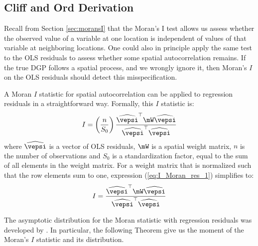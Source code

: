 \documentclass[english,12pt]{book}\usepackage[]{graphicx}\usepackage[]{xcolor}
\begin{document}
\subsection{Cliff and Ord Derivation}

Recall from Section \ref{sec:moransI} that the Moran's I test allows us assess whether the observed value of a variable at one location is independent of values of that variable at neighboring locations. One could also in principle apply the same test to the OLS residuals to assess whether some spatial autocorrelation remains. If the true DGP follows a spatial process, and we wrongly ignore it, then Moran's $I$ on the OLS residuals should detect this misspecification.

A Moran $I$ statistic for spatial autocorrelation can be applied to regression residuals in a straightforward way. Formally, this $I$ statistic is:
\begin{equation*}
I = \left(\frac{n}{S_0}\right)\frac{\widehat{\vepsi}^\top \mW\widehat{\vepsi}}{\widehat{\vepsi}^\top\widehat{\vepsi}}
\end{equation*}
%
where $\widehat{\vepsi}$ is a vector of OLS residuals, $\mW$ is a spatial weight matrix, $n$ is the number of observations and $S_0$ is a standardization factor, equal to the sum of all elements in the weight matrix. For a weight matrix that is normalized such that the row elements sum to one, expression (\ref{eq:I_Moran_res_1}) simplifies to:
\begin{equation}\label{eq:I_Moran_res_2}
I = \frac{\widehat{\vepsi}^\top \mW\widehat{\vepsi}}{\widehat{\vepsi}^\top\widehat{\vepsi}}
\end{equation}

The asymptotic distribution for the Moran statistic with regression residuals was developed by \cite{cliff1972testing, cliff1973spatial}.  In particular, the following Theorem give us the moment of the Moran's $I$ statistic and its distribution.
\end{document}
